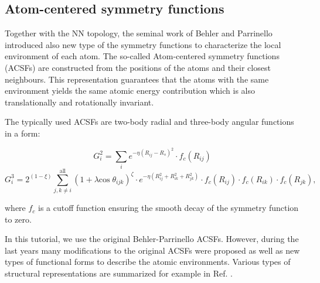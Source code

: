 \documentclass[12pt]{article}
\begin{document}
\subsection{Atom-centered symmetry functions}

Together with the NN topology, the seminal work of Behler and Parrinello introduced also new type of the symmetry functions to characterize the local environment of each atom. The so-called Atom-centered symmetry functions (ACSFs)\cite{behl11jcp} are constructed from the positions of the atoms and their closest neighbours. This representation guarantees that the atoms with the same environment yields the same atomic energy contribution which is also translationally and rotationally invariant. 

The typically used ACSFs are two-body radial and three-body angular functions in a form:

\begin{equation}
    G_i^2  = \sum_i e^{-\eta (R_{ij}-R_s)^2} \cdot f_c(R_{ij}) \label{eq:radial}
\end{equation}
\begin{equation}
    G_i^3  = 2^{(1-\xi)} \sum_{j,k \neq i}^{\mathrm{all}}(1 + \lambda \mathrm{cos}\;\theta_{ijk})^{\zeta} \cdot e^{-\eta (R_{ij}^2 + R_{ik}^2 + R_{jk}^2)} \cdot f_c(R_{ij}) \cdot f_c(R_{ik}) \cdot f_c(R_{jk}),
    \label{eq:angular}
\end{equation}

where $f_c$ is a cutoff function ensuring the smooth decay of the symmetry function to zero.   

In this tutorial, we use the original Behler-Parrinello ACSFs. However, during the last years many modifications to the original ACSFs were proposed as well as new types of functional forms to describe the atomic environments. Various types of structural representations are summarized for example in Ref. .

\end{document}
